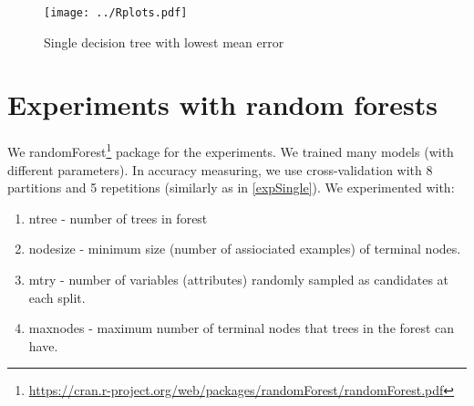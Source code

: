 \documentclass[a4paper]{article}
\begin{document}
\begin{multicols}{2}
\begin{figure}[H]
    \centering
    \texttt{[image: ../Rplots.pdf]}
    \label{fig:single}
    \caption[]{Single decision tree with lowest mean error}
\end{figure}

% 
% 
% 
\section{Experiments with random forests}
We randomForest\footnote{\url{https://cran.r-project.org/web/packages/randomForest/randomForest.pdf}} package for the experiments.
We trained many models (with different parameters).
In accuracy measuring, we use cross-validation with 8 partitions
and 5 repetitions (similarly as in \ref{expSingle}).
We experimented with:
\begin{enumerate}
    \item ntree - number of trees in forest
    \item nodesize - minimum size (number of assiociated examples) of terminal nodes.
    \item mtry - number of variables (attributes) randomly sampled as candidates at each split.
    \item maxnodes - maximum number of terminal nodes that trees in the forest can have.
\end{enumerate}


\end{multicols}
\end{document}
